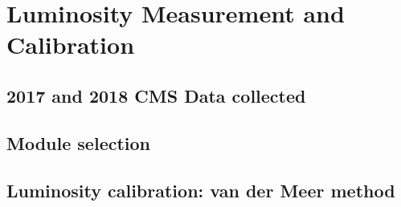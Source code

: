 \chapter{Luminosity  Measurement and Calibration}
\label{ch3}



\section{2017 and 2018 CMS Data collected}


\section{Module selection}



\section{Luminosity calibration: van der Meer method}



